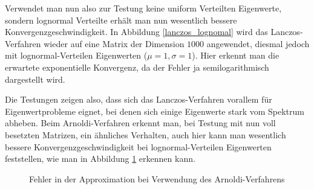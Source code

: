 \documentclass{article}
\theoremstyle{plain}
\begin{document}
Verwendet man nun also zur Testung keine uniform Verteilten Eigenwerte, sondern lognormal Verteilte erhält man nun wesentlich bessere Konvergenzgeschwindigkeit. In Abbildung \ref{lanczos_lognomal} wird das Lanczos-Verfahren wieder auf eine Matrix der Dimension $1000$ angewendet, diesmal jedoch mit lognormal-Verteilen Eigenwerten ($\mu = 1, \sigma = 1$). Hier erkennt man die erwartete exponentielle Konvergenz, da der Fehler ja semilogarithmisch dargestellt wird.



Die Testungen zeigen also, dass sich das Lanczos-Verfahren vorallem für Eigenwertprobleme eignet, bei denen sich einige Eigenwerte stark vom Spektrum abheben. Beim Arnoldi-Verfahren erkennt man, bei Testung mit nun voll besetzten Matrizen, ein ähnliches Verhalten, auch hier kann man wesentlich bessere Konvergenzgeschwindigkeit bei lognormal-Verteilen Eigenwerten feststellen, wie man in Abbildung \ref{Arnoldi_error} erkennen kann.

\begin{figure}[H]
  \centering
  \qquad
  \caption{Fehler in der Approximation bei Verwendung des Arnoldi-Verfahrens}%
  \label{Arnoldi_error}
\end{figure}
\end{document}
